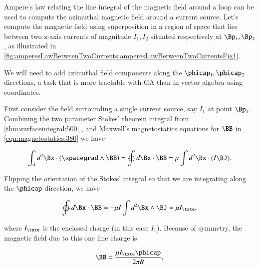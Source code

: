 %
%

Ampere's law relating the line integral of the magnetic field around a loop can be used to compute the azimuthal magnetic field around a current source.
Let's compute the magnetic field using superposition in a region of space that lies between two z-axis currents of magnitude \( I_1, I_2 \) situated respectively at \( \Bp_1, \Bp_2 \), as illustrated in
\cref{fig:amperesLawBetweenTwoCurrents:amperesLawBetweenTwoCurrentsFig1}.


We will need to add azimuthal field components along the \( \phicap_1, \phicap_2 \) directions, a task that is more tractable with GA than in vector algebra using coordinates.

First consider the field surrounding a single current source, say \( I_1 \) at point \( \Bp_1 \).
Combining the two parameter Stokes' theorem integral from 
\cref{thm:surfaceintegral:500}
, and Maxwell's magnetostatics equations for \( \BB \) in \cref{eqn:magnetostatics:380} we have

\begin{dmath}\label{eqn:amperesLawMagnetostaticsExample:20}
\int_A d^2 \Bx \cdot (\spacegrad \wedge \BB) = \ointclockwise d\Bx \cdot \BB = \mu \int d^2 \Bx \cdot (I \BJ).
\end{dmath}

Flipping the orientation of the Stokes' integral so that we are integrating along the \( \phicap \) direction, we have

\begin{dmath}\label{eqn:amperesLawMagnetostaticsExample:40}
\ointctrclockwise d\Bx \cdot \BB
= -\mu I \int d^2 \Bx \wedge \BJ
= \mu I_\txte,
\end{dmath}

where \( I_\txte \) is the enclosed charge (in this case \( I_1 \)).
Because of symmetry, the magnetic field due to this one line charge is

\begin{dmath}\label{eqn:amperesLawMagnetostaticsExample:60}
\BB
= \frac{\mu I_\txte \phicap}{2 \pi R},
\end{dmath}

